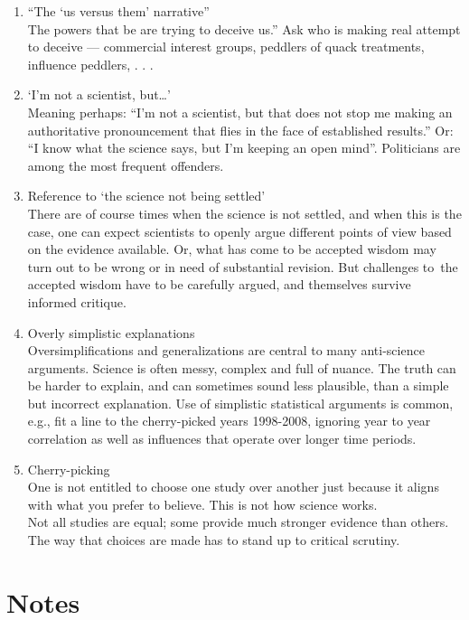 \documentclass[
  10pt,
  b5paper]{book}
\providecommand{\tightlist}{%
  \setlength{\itemsep}{0pt}\setlength{\parskip}{0pt}}
\begin{document}
\begin{enumerate}
\def\labelenumi{\arabic{enumi}.}
\tightlist
\item
  ``The `us versus them' narrative''\\
  The powers that be are trying to deceive us.'' Ask who is
  making real attempt to deceive --- commercial interest groups,
  peddlers of quack treatments, influence peddlers, . . .
\item
  `I'm not a scientist, but\ldots{}'\\
  Meaning perhaps: ``I'm not a scientist, but that does not stop me
  making an authoritative pronouncement that flies in the face of
  established results.'' Or: ``I know what the science says, but
  I'm keeping an open mind''. Politicians are among the most
  frequent offenders.
\item
  Reference to `the science not being settled'\\
  There are of course times when the science is not settled,
  and when this is the case, one can expect scientists to
  openly argue different points of view based on the evidence
  available. Or, what has come to be accepted wisdom
  may turn out to be wrong or in need of substantial
  revision. But challenges to~the accepted wisdom have to be
  carefully argued, and themselves survive informed critique.
\item
  Overly simplistic explanations\\
  Oversimplifications and generalizations are central to many
  anti-science arguments. Science is often messy, complex and full
  of nuance. The truth can be harder to explain, and can sometimes
  sound less plausible, than a simple but incorrect explanation.
  Use of simplistic statistical arguments is common, e.g., fit a
  line to the cherry-picked years 1998-2008, ignoring year to year
  correlation as well as influences that operate over longer time
  periods.
\item
  Cherry-picking\\
  One is not entitled to choose one study over another just because it aligns
  with what you prefer to believe. This is not how science works.\\
  Not all studies are equal; some provide much stronger evidence than others.
  The way that choices are made has to stand up to critical scrutiny.
\end{enumerate}

\hypertarget{notes}{%
\chapter{Notes}\label{notes}}
\end{document}
